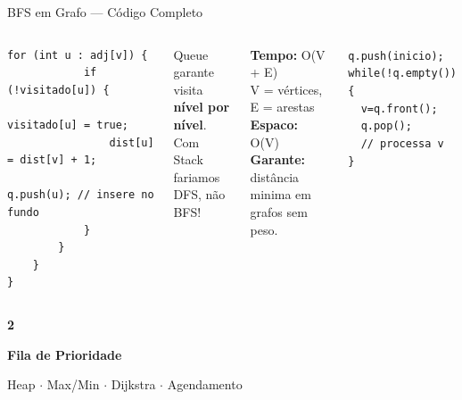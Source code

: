 \documentclass[aspectratio=169,10pt]{beamer}
\begin{document}
\begin{frame}[fragile,shrink=5]{BFS em Grafo --- Código Completo}
\begin{columns}[t]
\begin{tcolorbox}[caixaCodigo]
\begin{lstlisting}[style=cppsmall]
        for (int u : adj[v]) {
            if (!visitado[u]) {
                visitado[u] = true;
                dist[u] = dist[v] + 1;
                q.push(u); // insere no fundo
            }
        }
    }
}
        \end{lstlisting}
      \end{tcolorbox}
      \begin{tcolorbox}[caixaAzul,title={Por que Queue?}]
        \footnotesize
        Queue garante visita\\
        \textbf{nível por nível}.\\[3pt]
        Com Stack fariamos\\
        DFS, não BFS!
      \end{tcolorbox}
      \vspace{0.08cm}
      \begin{tcolorbox}[caixaVerde,title={Complexidade BFS}]
        \footnotesize
        \textbf{Tempo:} O(V + E)\\
        V = vértices, E = arestas\\[3pt]
        \textbf{Espaco:} O(V)\\[3pt]
        \textbf{Garante:} distância\\
        minima em grafos sem peso.
      \end{tcolorbox}
      \vspace{0.08cm}
      \begin{tcolorbox}[caixaAmarelo,title={Padrao de uso}]
        \footnotesize
        \texttt{q.push(inicio);}\\
        \texttt{while(!q.empty())\{}\\
        \texttt{\ \ v=q.front();}\\
        \texttt{\ \ q.pop();}\\
        \texttt{\ \ // processa v}\\
        \texttt{\}}
      \end{tcolorbox}
  \end{columns}
\end{frame}

{
\begin{frame}[noframenumbering]
  \centering\vspace{1.2cm}
  {\fontsize{38}{46}\selectfont\bfseries\color{gemaBlue} 2}\par
  \vspace{0.25cm}
  {\Large\color{pqColor}\bfseries Fila de Prioridade}\par
  \vspace{0.15cm}
  {\color{gray}\small Heap $\cdot$ Max/Min $\cdot$ Dijkstra $\cdot$ Agendamento}
\end{frame}
}
\end{document}
